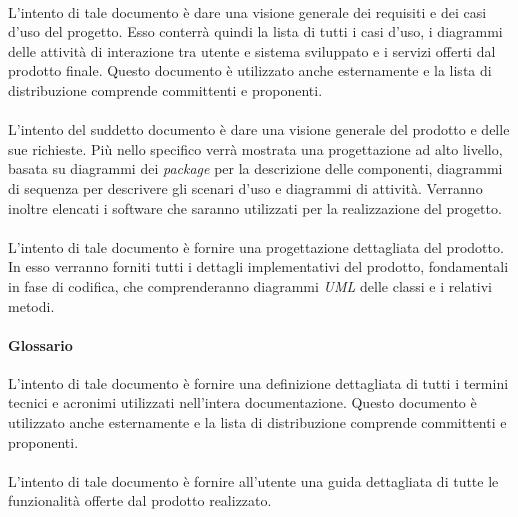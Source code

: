 \paragraph{\AdR}
L'intento di tale documento è dare una visione generale dei requisiti e dei casi 
d'uso del progetto. Esso conterrà quindi la lista di tutti i casi d'uso, 
i diagrammi delle attività di interazione tra utente e sistema sviluppato e 
i servizi offerti dal prodotto finale. Questo documento è 
utilizzato anche esternamente e la lista di distribuzione comprende committenti 
e proponenti.
\paragraph{\ST}
L'intento del suddetto documento è dare una visione generale del prodotto e 
delle sue richieste. Più nello specifico verrà mostrata una progettazione ad 
alto livello, basata su diagrammi dei \textit{package} per la descrizione delle 
componenti, diagrammi di sequenza per descrivere gli scenari d'uso e diagrammi 
di attività. Verranno inoltre elencati i software che saranno utilizzati per la realizzazione del progetto. 
\paragraph{\DDP}
L'intento di tale documento è fornire una progettazione dettagliata del 
prodotto. In esso verranno forniti tutti i dettagli implementativi 
del prodotto, fondamentali in fase di codifica, che comprenderanno diagrammi \textit{UML} 
delle classi e i relativi metodi.
\paragraph{Glossario}
L'intento di tale documento è fornire una definizione dettagliata di tutti i 
termini tecnici e acronimi utilizzati nell'intera documentazione. Questo documento è 
utilizzato anche esternamente e la lista di distribuzione comprende committenti 
e proponenti.
\paragraph{\MU}
L'intento di tale documento è fornire all'utente una guida dettagliata di tutte 
le funzionalità offerte dal prodotto realizzato.
